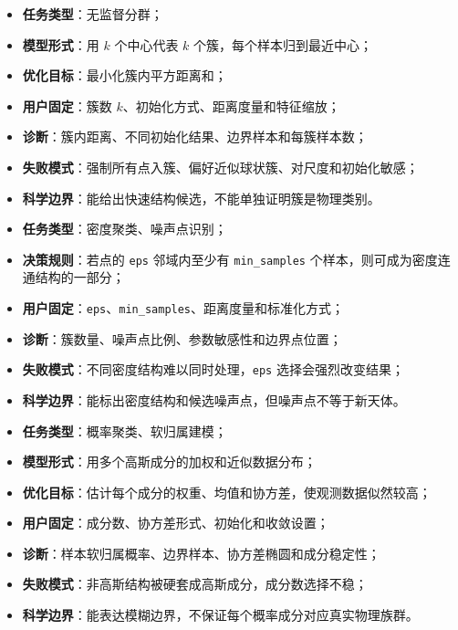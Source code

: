 \begin{examplebox}
\begin{itemize}
    \item \textbf{任务类型}：无监督分群；
    \item \textbf{模型形式}：用 \(k\) 个中心代表 \(k\) 个簇，每个样本归到最近中心；
    \item \textbf{优化目标}：最小化簇内平方距离和；
    \item \textbf{用户固定}：簇数 \(k\)、初始化方式、距离度量和特征缩放；
    \item \textbf{诊断}：簇内距离、不同初始化结果、边界样本和每簇样本数；
    \item \textbf{失败模式}：强制所有点入簇、偏好近似球状簇、对尺度和初始化敏感；
    \item \textbf{科学边界}：能给出快速结构候选，不能单独证明簇是物理类别。
\end{itemize}
\end{examplebox}

\begin{examplebox}
\begin{itemize}
    \item \textbf{任务类型}：密度聚类、噪声点识别；
    \item \textbf{决策规则}：若点的 \texttt{eps} 邻域内至少有 \texttt{min\_samples} 个样本，则可成为密度连通结构的一部分；
    \item \textbf{用户固定}：\texttt{eps}、\texttt{min\_samples}、距离度量和标准化方式；
    \item \textbf{诊断}：簇数量、噪声点比例、参数敏感性和边界点位置；
    \item \textbf{失败模式}：不同密度结构难以同时处理，\texttt{eps} 选择会强烈改变结果；
    \item \textbf{科学边界}：能标出密度结构和候选噪声点，但噪声点不等于新天体。
\end{itemize}
\end{examplebox}

\begin{examplebox}
\begin{itemize}
    \item \textbf{任务类型}：概率聚类、软归属建模；
    \item \textbf{模型形式}：用多个高斯成分的加权和近似数据分布；
    \item \textbf{优化目标}：估计每个成分的权重、均值和协方差，使观测数据似然较高；
    \item \textbf{用户固定}：成分数、协方差形式、初始化和收敛设置；
    \item \textbf{诊断}：样本软归属概率、边界样本、协方差椭圆和成分稳定性；
    \item \textbf{失败模式}：非高斯结构被硬套成高斯成分，成分数选择不稳；
    \item \textbf{科学边界}：能表达模糊边界，不保证每个概率成分对应真实物理族群。
\end{itemize}
\end{examplebox}

